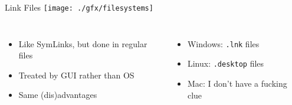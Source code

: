 \begin{frame}{Link Files}
%
\texttt{[image: ./gfx/filesystems]}
%
\begin{columns}
	\begin{itemize}
	\item Like SymLinks, but done in regular files
	\item Treated by GUI rather than OS
	\item Same (dis)advantages
	\end{itemize}
%
	\begin{itemize}
	\item Windows: \texttt{.lnk} files
	\item Linux: \texttt{.desktop} files
	\item Mac: I don't have a fucking clue
	\end{itemize}
\end{columns}
%
\end{frame}


